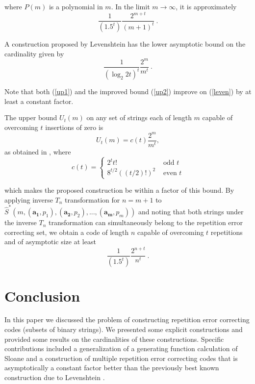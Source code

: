 \documentclass[10pt,conference]{IEEEtran}
\begin{document}
where $P(m)$ is a polynomial in $m$. In the limit $m \rightarrow
\infty$, it is approximately
\begin{equation}\frac{1}{(1.5^t)}\frac{2^{m+t}}{(m+1)^t}~.\end{equation}

A construction proposed by Levenshtein \cite{lev:66a} has the lower
asymptotic bound on the cardinality given by
\begin{equation}\label{leven}
\frac{1}{(\log_2 2t)^t}\frac{2^m}{m^t}~.
\end{equation}

Note that both (\ref{up1}) and the improved bound (\ref{up2})
improve on (\ref{leven}) by at least a constant factor.

The upper bound $U_t(m)$ on any set of strings each of length $m$
capable of overcoming $t$ insertions of zero is \[U_t(m)=c(t)
\frac{2^m}{m^t},\] as obtained in \cite{lev:66a}, where \[ c(t)
=\left\{
\begin{array}{lll} 2^t t! &
\text{ odd } t\\
8^{t/2}((t/2)!)^2&\text{ even } t\end{array} \right. \]

which makes the proposed construction be within a factor of this
bound. By applying inverse $T_n$ transformation for $n=m+1$ to
$\hat{S}^*\left(m,(\mathbf{a_1},p_1),(\mathbf{a_2},p_2),...,(\mathbf{a_m},p_m)\right)$
and noting that both strings under the inverse $T_n$ transformation
can simultaneously belong to the repetition error correcting set, we
obtain a code of length $n$ capable of overcoming $t$ repetitions
and of asymptotic size at least
\begin{equation}\frac{1}{(1.5^t)}\frac{2^{n+t}}{n^t}~.\end{equation}

\section{Conclusion}
In this paper we discussed the problem
of constructing repetition error correcting
codes (subsets of binary strings).
We presented some explicit constructions and provided
some results on
the cardinalities of these constructions.
Specific contributions included a generalization of a
generating function calculation of Sloane \cite{sloane:00}
and a construction of multiple repetition error correcting
codes that is asymptotically a constant factor better than
the previously best known construction due to
Levenshtein \cite{lev:66a}.
\end{document}
